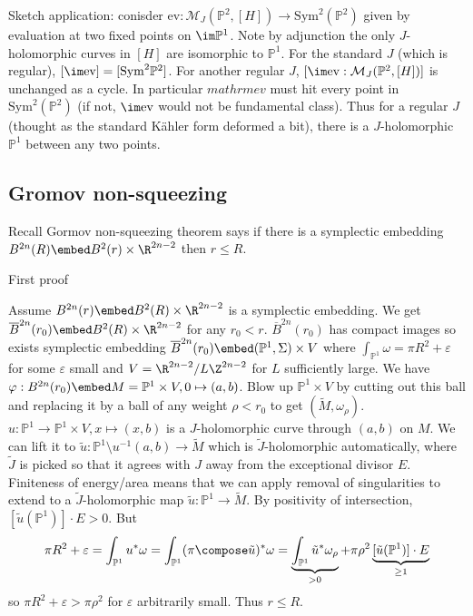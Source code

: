 \documentclass[a4paper]{article}
\renewcommand*{\P}{\mathbb{P}}
\begin{document}
Sketch application: conisder \(\mathrm{ev}: \mathcal M_J(\P^2, [H]) \to \mathrm{Sym}^2(\P^2)\) given by evaluation at two fixed points on \(\im \P^1\). Note by adjunction the only \(J\)-holomorphic curves in \([H]\) are isomorphic to \(\P^1\). For the standard \(J\) (which is regular), \([\im \mathrm{ev}] = [\mathrm{Sym}^2 \P^2]\). For another regular \(J\), \([\im \mathrm{ev}: \mathcal M_J(\P^2, [H])]\) is unchanged as a cycle. In particular \(mathrm{ev}\) must hit every point in \(\mathrm{Sym}^2(\P^2)\) (if not, \(\im \mathrm{ev}\) would not be fundamental class). Thus for a regular \(J\) (thought as the standard Kähler form deformed a bit), there is a \(J\)-holomorphic \(\P^1\) between any two points.

\subsection{Gromov non-squeezing}

Recall Gormov non-squeezing theorem says if there is a symplectic embedding \(B^{2n}(R) \embed B^2(r) \times \R^{2n - 2}\) then \(r \leq R\).

First proof

Assume \(B^{2n}(r) \embed B^2(R) \times \R^{2n - 2}\) is a symplectic embedding. We get \(\overline B^{2n}(r_0) \embed B^2(R) \times \R^{2n - 2}\) for any \(r_0 < r\). \(\overline B^{2n}(r_0)\) has compact images so exists symplectic embedding \(\overline B^{2n}(r_0) \embed (\P^1, \Sigma) \times V\) where \(\int_{\P^1} \omega = \pi R^2 + \varepsilon\) for some \(\varepsilon\) small and \(V = \R^{2n - 2}/L \Z^{2n - 2}\) for \(L\) sufficiently large. We have \(\varphi: B^{2n}(r_0) \embed M = \P^1 \times V, 0 \mapsto (a, b)\). Blow up \(\P^1 \times V\) by cutting out this ball and replacing it by a ball of any weight \(\rho < r_0\) to get \((\tilde M, \omega_\rho)\). \(u: \P^1 \to \P^1 \times V, x \mapsto (x, b)\) is a \(J\)-holomorphic curve through \((a, b)\) on \(M\). We can lift it to \(\tilde u: \P^1 \setminus u^{-1}(a, b) \to \tilde M\) which is \(\tilde J\)-holomorphic automatically, where \(\tilde J\) is picked so that it agrees with \(J\) away from the exceptional divisor \(E\). Finiteness of energy/area means that we can apply removal of singularities to extend to a \(\tilde J\)-holomorphic map \(\tilde u: \P^1 \to \tilde M\). By positivity of intersection, \([\tilde u(\P^1)] \cdot E > 0\). But
\[
  \pi R^2 + \varepsilon = \int_{\P^1} u^*\omega = \int_{\P^1} (\pi \compose \tilde u)^* \omega = \underbrace{\int_{\P^1} \tilde u^* \omega_\rho}_{> 0} + \pi\rho^2 \underbrace{[\tilde u(\P^1)] \cdot E}_{\geq 1}
\]
so \(\pi R^2 + \varepsilon > \pi \rho^2\) for \(\varepsilon\) arbitrarily small. Thus \(r \leq R\).
\end{document}
